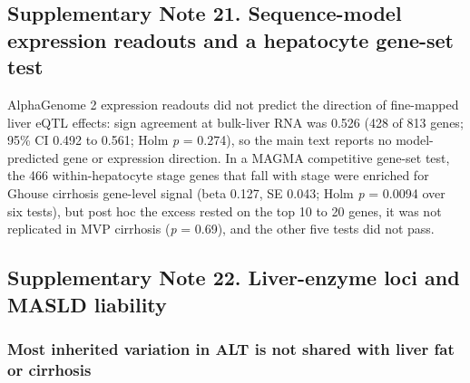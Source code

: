\subsection{Supplementary Note 21. Sequence-model expression readouts and a hepatocyte gene-set test}\label{supplementary-note-21}

AlphaGenome 2 expression readouts did not predict the direction of fine-mapped liver eQTL effects: sign agreement at bulk-liver RNA was 0.526 (428 of 813 genes; 95\% CI 0.492 to 0.561; Holm \emph{p} = 0.274), so the main text reports no model-predicted gene or expression direction. In a MAGMA competitive gene-set test, the 466 within-hepatocyte stage genes that fall with stage were enriched for Ghouse cirrhosis gene-level signal (beta 0.127, SE 0.043; Holm \emph{p} = 0.0094 over six tests), but post hoc the excess rested on the top 10 to 20 genes, it was not replicated in MVP cirrhosis (\emph{p} = 0.69), and the other five tests did not pass.

\subsection{Supplementary Note 22. Liver-enzyme loci and MASLD liability}\label{supplementary-note-22}

\subsubsection{Most inherited variation in ALT is not shared with liver fat or cirrhosis}\label{alt-heritability-shared}


